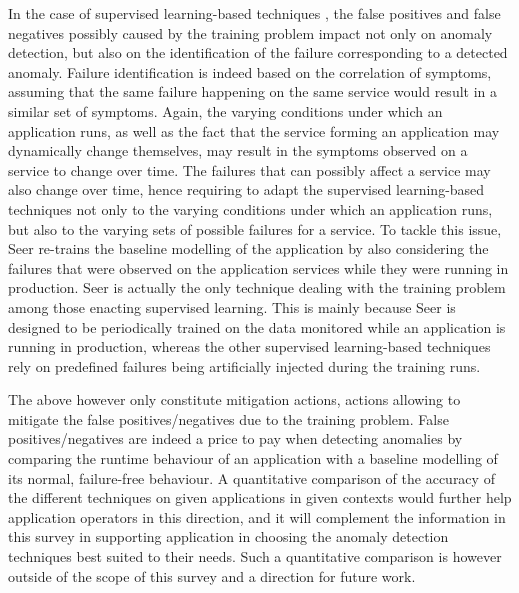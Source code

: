 In the case of supervised learning-based techniques \cite{36_Bogatinovski2020_SelfSupervisedAnomalyDetection,15_Du2018_AnomalyDetectionContainerMicroservices,02_Zhou2019_LatentErrorPrediction,34_Nedelkoski2019_AnomalyDetectionDistributedTracing,33_Mariani2020_PredictingFailures,17_Gan2019_Seer}, the false positives and false negatives possibly caused by the training problem impact not only on anomaly detection, but also on the identification of the failure corresponding to a detected anomaly. 
Failure identification is indeed based on the correlation of symptoms, assuming that the same failure happening on the same service would result in a similar set of symptoms. 
Again, the varying conditions under which an application runs, as well as the fact that the service forming an application may dynamically change themselves, may result in the symptoms observed on a service to change over time.
The failures that can possibly affect a service may also change over time, hence requiring to adapt the supervised learning-based techniques not only to the varying conditions under which an application runs, but also to the varying sets of possible failures for a service.
To tackle this issue, Seer \cite{17_Gan2019_Seer} re-trains the baseline modelling of the application by also considering the failures that were observed on the application services while they were running in production.
Seer \cite{17_Gan2019_Seer} is actually the only technique  dealing with the training problem among those enacting supervised learning.
This is mainly because Seer \cite{17_Gan2019_Seer} is designed to be periodically trained on the data monitored while an application is running in production, whereas the other supervised learning-based techniques rely on predefined failures being artificially injected during the training runs.

The above however only constitute mitigation actions, \viz actions allowing to mitigate the false positives/negatives due to the training problem. 
False positives/negatives are indeed a price to pay when detecting anomalies by comparing the runtime behaviour of an application with a baseline modelling of its normal, failure-free behaviour.
A quantitative comparison of the accuracy of the different techniques on given applications in given contexts would further help application operators in this direction, and it will complement the information in this survey in supporting application in choosing the anomaly detection techniques best suited to their needs.
Such a quantitative comparison is however outside of the scope of this survey and a direction for future work.

